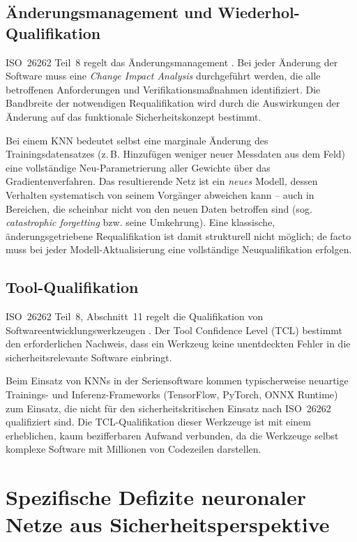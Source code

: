 ﻿\documentclass[12pt,a4paper]{article}
\begin{document}
\subsection{\"Anderungsmanagement und Wiederhol-Qualifikation}
\label{subsec:aenderungsmanagement}

ISO~26262 Teil~8 regelt das \"Anderungsmanagement \cite{iso26262_8}. Bei jeder
\"Anderung der Software muss eine \emph{Change Impact Analysis} durchgef\"uhrt
werden, die alle betroffenen Anforderungen und Verifikationsma\ss{}nahmen
identifiziert. Die Bandbreite der notwendigen Requalifikation wird durch die
Auswirkungen der \"Anderung auf das funktionale Sicherheitskonzept bestimmt.

Bei einem KNN bedeutet selbst eine marginale \"Anderung des Trainingsdatensatzes
(z.\,B. Hinzuf\"ugen weniger neuer Messdaten aus dem Feld) eine vollst\"andige
Neu-Parametrierung aller Gewichte \"uber das Gradientenverfahren. Das resultierende
Netz ist ein \emph{neues} Modell, dessen Verhalten systematisch von seinem
Vorg\"anger abweichen kann -- auch in Bereichen, die scheinbar nicht von den
neuen Daten betroffen sind (sog. \emph{catastrophic forgetting} bzw. seine
Umkehrung). Eine klassische, \"anderungsgetriebene Requalifikation ist damit
strukturell nicht m\"oglich; de facto muss bei jeder Modell-Aktualisierung eine
vollst\"andige Neuqualifikation erfolgen.

\subsection{Tool-Qualifikation}
\label{subsec:tool_qualifikation}

ISO~26262 Teil~8, Abschnitt~11 regelt die Qualifikation von Softwareentwicklungswerkzeugen
\cite{iso26262_8}. Der Tool Confidence Level (TCL) bestimmt den erforderlichen Nachweis,
dass ein Werkzeug keine unentdeckten Fehler in die sicherheitsrelevante Software einbringt.

Beim Einsatz von KNNs in der Seriensoftware kommen typischerweise neuartige Trainings-
und Inferenz-Frameworks (TensorFlow, PyTorch, ONNX Runtime) zum Einsatz, die nicht f\"ur
den sicherheitskritischen Einsatz nach ISO~26262 qualifiziert sind. Die TCL-Qualifikation
dieser Werkzeuge ist mit einem erheblichen, kaum bezifferbaren Aufwand verbunden, da die
Werkzeuge selbst komplexe Software mit Millionen von Codezeilen darstellen.

\section{Spezifische Defizite neuronaler Netze aus Sicherheitsperspektive}
\label{sec:knn_probleme}
\end{document}
